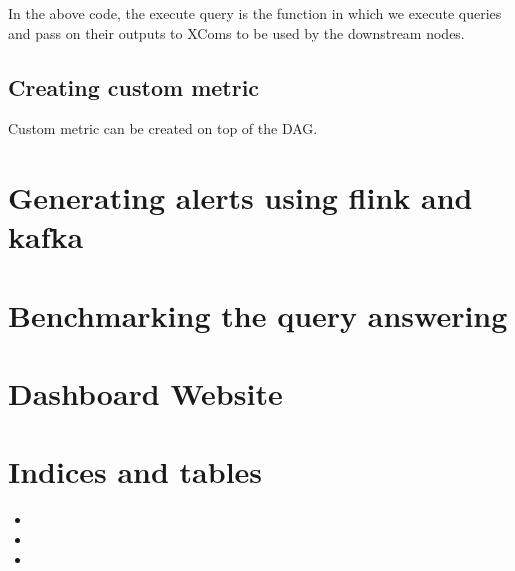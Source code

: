 \documentclass[letterpaper,10pt,english]{sphinxmanual}
\begin{document}
In the above code, the execute query is the function in which we execute queries and pass on their outputs to XComs to be used by the downstream nodes.

%
\begin{sphinxVerbatim}[commandchars=\\\{\}]
\PYG{p}{[}\PYG{p}{]}
\PYG{p}{[}\PYG{p}{]}\PYG{p}{[}\PYG{p}{]}  
\end{sphinxVerbatim}


\section{Creating custom metric}
\label{\detokenize{dag:creating-custom-metric}}
Custom metric can be created on top of the DAG.


\chapter{Generating alerts using flink and kafka}
\label{\detokenize{flink:generating-alerts-using-flink-and-kafka}}\label{\detokenize{flink::doc}}

\chapter{Benchmarking the query answering}
\label{\detokenize{benchmarking:benchmarking-the-query-answering}}\label{\detokenize{benchmarking::doc}}

\chapter{Dashboard Website}
\label{\detokenize{dashboard_website:dashboard-website}}\label{\detokenize{dashboard_website::doc}}

\chapter{Indices and tables}
\label{\detokenize{index:indices-and-tables}}\begin{itemize}
\item {} 

\item {} 

\item {} 

\end{itemize}
\end{document}
